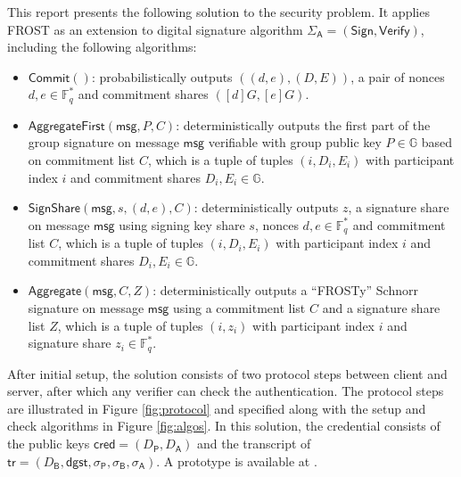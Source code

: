 \documentclass[a4paper]{article}
\begin{document}
This report presents the following solution to the security problem. It applies FROST \cite{cryptoeprint:2020/852} \cite{rfc9591} as an extension to digital signature algorithm $\Sigma_\mathsf A=(\mathsf{Sign},\mathsf{Verify})$, including the following algorithms:
\begin{itemize}
\item $\mathsf{Commit}()$: probabilistically outputs $((d,e),(D,E))$, a pair of nonces $d,e\in\mathbb F^*_q$ and commitment shares $([d]G,[e]G)$.
\item $\mathsf{AggregateFirst}(\mathsf{msg},P,C)$: deterministically outputs the first part of the group signature on message $\mathsf{msg}$ verifiable with group public key $P\in\mathbb G$ based on commitment list $C$, which is a tuple of tuples $(i,D_i,E_i)$ with participant index $i$ and commitment shares $D_i,E_i\in\mathbb G$.
\item $\mathsf{SignShare}(\mathsf{msg},s,(d,e),C)$: deterministically outputs $z$, a signature share on message $\mathsf{msg}$ using signing key share $s$, nonces $d,e\in\mathbb F^*_q$ and commitment list $C$, which is a tuple of tuples $(i,D_i,E_i)$ with participant index $i$ and commitment shares $D_i,E_i\in\mathbb G$.
\item $\mathsf{Aggregate}(\mathsf{msg},C,Z)$: deterministically outputs a “FROSTy” Schnorr signature on message $\mathsf{msg}$ using a commitment list $C$ and a signature share list $Z$, which is a tuple of tuples $(i,z_i)$ with participant index $i$ and signature share $z_i\in\mathbb F^*_q$.
\end{itemize}

After initial setup, the solution consists of two protocol steps between client and server, after which any verifier can check the authentication. The protocol steps are illustrated in Figure \ref{fig:protocol} and specified along with the setup and check algorithms in Figure \ref{fig:algos}. In this solution, the credential consists of the public keys $\mathsf{cred}=(D_\mathsf P,D_\mathsf A)$ and the transcript of $\mathsf{tr}=(D_\mathsf{B},\mathsf{dgst},\sigma_\mathsf P,\sigma_\mathsf B,\sigma_\mathsf A)$. A prototype is available at \cite{SCAL3}.
\end{document}
